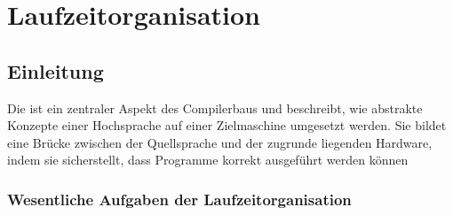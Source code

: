 \section{Laufzeitorganisation}
\subsection{Einleitung}
Die  ist ein zentraler Aspekt des Compilerbaus und beschreibt, wie abstrakte Konzepte einer Hochsprache auf einer Zielmaschine umgesetzt werden. Sie bildet eine Brücke zwischen der Quellsprache und der zugrunde liegenden Hardware, indem sie sicherstellt, dass Programme korrekt ausgeführt werden können
\subsubsection{Wesentliche Aufgaben der Laufzeitorganisation}
